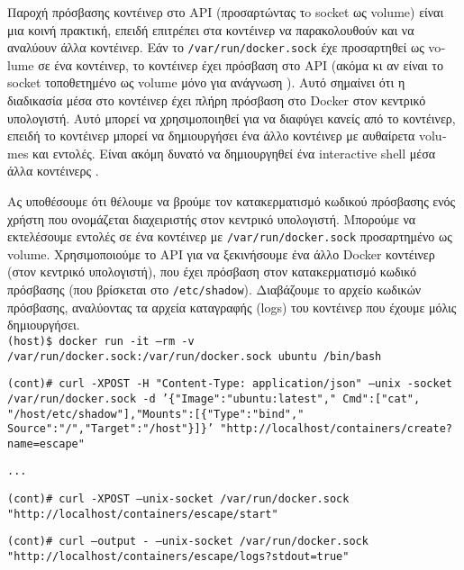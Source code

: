 Παροχή πρόσβασης κοντέινερ στο \textlatin{API} (προσαρτώντας τo
\textlatin{socket} ως \textlatin{volume}) είναι μια κοινή πρακτική, επειδή
επιτρέπει στα κοντέινερ να παρακολουθούν και να αναλύουν
άλλα κοντέινερ. Εάν το \texttt{\textlatin{/var/run/docker.sock}} έχε
προσαρτηθεί ως \textlatin{volume} σε ένα κοντέινερ, το κοντέινερ έχει πρόσβαση
στο \textlatin{API} (ακόμα κι αν είναι το \textlatin{socket} τοποθετημένο ως
\textlatin{volume} μόνο για ανάγνωση \cite{The-Dangers-Of-Docker-Sock}
\cite{Read-Only-Docker-Socket-Tweet} \cite{Read-Only-Docker-Socket-Hackernews}).
Αυτό σημαίνει ότι η διαδικασία μέσα στο κοντέινερ έχει πλήρη πρόσβαση στο
\textlatin{Docker} στον κεντρικό υπολογιστή. Αυτό μπορεί να χρησιμοποιηθεί για
να διαφύγει κανείς από το κοντέινερ, επειδή το κοντέινερ μπορεί να δημιουργήσει
ένα άλλο κοντέινερ με αυθαίρετα \textlatin{volumes} και εντολές. Είναι ακόμη
δυνατό να δημιουργηθεί ένα \textlatin{interactive shell} μέσα άλλα κοντέινερς
\cite{Escape-Socket-Shell}.

Ας υποθέσουμε ότι θέλουμε να βρούμε τον κατακερματισμό κωδικού πρόσβασης ενός
χρήστη που ονομάζεται διαχειριστής στον κεντρικό υπολογιστή. Μπορούμε να
εκτελέσουμε εντολές σε ένα κοντέινερ με
\texttt{\textlatin{/var/run/docker.sock}} προσαρτημένο ως \textlatin{volume}.
Χρησιμοποιούμε το \textlatin{API} για να ξεκινήσουμε ένα άλλο \textlatin{Docker}
κοντέινερ (στον κεντρικό υπολογιστή), που έχει πρόσβαση στον κατακερματισμό
κωδικό πρόσβασης (που βρίσκεται στο \texttt{\textlatin{/etc/shadow}}).
Διαβάζουμε το αρχείο κωδικών πρόσβασης, αναλύοντας τα αρχεία καταγραφής
(\textlatin{logs}) του κοντέινερ που έχουμε μόλις δημιουργήσει. \\

\texttt{\textlatin{(host)\$ docker run -it --rm -v /var/run/docker.sock:/var/run/docker.sock ubuntu /bin/bash}}

\texttt{\textlatin{(cont)\# curl -XPOST -H "Content-Type: application/json" --unix -socket /var/run/docker.sock -d '\{"Image":"ubuntu:latest"," Cmd":["cat", "/host/etc/shadow"],"Mounts":[\{"Type":"bind"," Source":"/","Target":"/host"\}]\}' "http://localhost/containers/create?name=escape"}}

\texttt{\textlatin{...}}

\texttt{\textlatin{(cont)\# curl -XPOST --unix-socket /var/run/docker.sock "http://localhost/containers/escape/start"}}

\texttt{\textlatin{(cont)\# curl --output - --unix-socket /var/run/docker.sock "http://localhost/containers/escape/logs?stdout=true"}}

